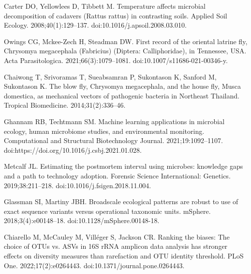 \documentclass[
  10pt,
  letterpaper,
]{article}
\begin{document}
\begin{thebibliography}{10}
  Carter DO, Yellowlees D, Tibbett M.
  \newblock Temperature affects microbial decomposition of cadavers ({Rattus}
    rattus) in contrasting soils.
  \newblock Applied Soil Ecology. 2008;40(1):129--137.
  \newblock doi:{10.1016/j.apsoil.2008.03.010}.
  
  Owings CG, Mckee-Zech H, Steadman DW.
  \newblock First record of the oriental latrine fly, {Chrysomya} megacephala
    ({Fabricius}) ({Diptera}: {Calliphoridae}), in {Tennessee}, {USA}.
  \newblock Acta Parasitologica. 2021;66(3):1079--1081.
  \newblock doi:{10.1007/s11686-021-00346-y}.
  
  Chaiwong T, Srivoramas T, Sueabsamran P, Sukontason K, Sanford M, Sukontason K.
  \newblock The blow fly, {Chrysomya} megacephala, and the house fly, {Musca}
    domestica, as mechanical vectors of pathogenic bacteria in {Northeast}
    {Thailand}.
  \newblock Tropical Biomedicine. 2014;31(2):336--46.
  
  Ghannam RB, Techtmann SM.
  \newblock Machine learning applications in microbial ecology, human microbiome
    studies, and environmental monitoring.
  \newblock Computational and Structural Biotechnology Journal.
    2021;19:1092--1107.
  \newblock doi:{https://doi.org/10.1016/j.csbj.2021.01.028}.
  
  Metcalf JL.
  \newblock Estimating the postmortem interval using microbes: knowledge gaps and
    a path to technology adoption.
  \newblock Forensic Science International: Genetics. 2019;38:211--218.
  \newblock doi:{10.1016/j.fsigen.2018.11.004}.
  
  Glassman SI, Martiny JBH.
  \newblock Broadscale ecological patterns are robust to use of exact sequence
    variants versus operational taxonomic units.
  \newblock mSphere. 2018;3(4):e00148--18.
  \newblock doi:{10.1128/mSphere.00148-18}.
  
  Chiarello M, McCauley M, Villéger S, Jackson CR.
  \newblock Ranking the biases: {The} choice of {OTUs} vs. {ASVs} in {16S} {rRNA}
    amplicon data analysis has stronger effects on diversity measures than
    rarefaction and {OTU} identity threshold.
  \newblock PLoS One. 2022;17(2):e0264443.
  \newblock doi:{10.1371/journal.pone.0264443}.
  
  \end{thebibliography}
  
\end{document}

